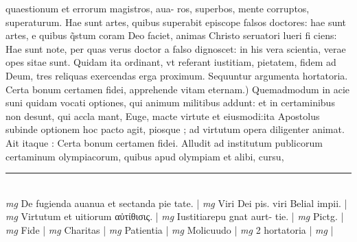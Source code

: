 \documentclass{article}
\begin{document}
\begin{pages}
quaestionum et errorum magistros, aua- ros, superbos, mente corruptos, superaturum. Hae sunt artes, quibus superabit episcope falsos doctores: hae sunt artes, e quibus q̃stum coram Deo faciet, animas Christo seruatori lueri fi ciens: Hae sunt note, per quas verus doctor a falso dignoscet: in his vera scientia, verae opes sitae sunt. Quidam ita ordinant, vt referant iustitiam, pietatem, fidem ad Deum, tres reliquas exercendas erga proximum. Sequuntur argumenta hortatoria.  \pend\pstart Certa bonum certamen fidei, apprehende vitam eternam.) Quemadmodum in acie suni quidam vocati optiones, qui animum militibus addunt: et in certaminibus non desunt, qui accla mant, Euge, macte virtute et eiusmodi:ita Apostolus subinde optionem hoc pacto agit, piosque ; ad virtutum opera diligenter animat. Ait itaque : Certa bonum certamen fidei. Alludit ad institutum publicorum certaminum olympiacorum, quibus apud olympiam et alibi, cursu,  \pend
\vspace{0.5cm}\noindent
\vspace{0.2cm}\rule{1cm}{0.2pt}\\ 
\hspace{0.2cm}\textit{mg}
\footnotesize De fugienda auanua et sectanda pie tate. 
\normalsize| 
\hspace{0.2cm}\textit{mg}
\footnotesize Viri Dei pis. viri Belial impii. 
\normalsize| 
\hspace{0.2cm}\textit{mg}
\footnotesize Virtutum et uitiorum αὐτίθισις. 
\normalsize| 
\hspace{0.2cm}\textit{mg}
\footnotesize Iustitiarepu gnat aurt- tie. 
\normalsize| 
\hspace{0.2cm}\textit{mg}
\footnotesize Pictg. 
\normalsize| 
\hspace{0.2cm}\textit{mg}
\footnotesize Fide 
\normalsize| 
\hspace{0.2cm}\textit{mg}
\footnotesize Charitas 
\normalsize| 
\hspace{0.2cm}\textit{mg}
\footnotesize Patientia 
\normalsize| 
\hspace{0.2cm}\textit{mg}
\footnotesize Molicuudo 
\normalsize| 
\hspace{0.2cm}\textit{mg}
\footnotesize 2 hortatoria 
\normalsize| 
\hspace{0.2cm}\textit{mg}
\footnotesize   
\normalsize| 

\end{pages}
\end{document}
